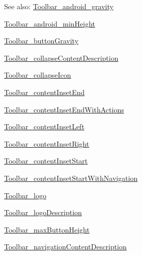 \begin{Desc}
\item[See also:]\hyperlink{classandroid_1_1support_1_1v4_1_1_r_1_1styleable_c8fd7f49fc578cf34e84a402ac885942}{Toolbar\_\-android\_\-gravity} 

\hyperlink{classandroid_1_1support_1_1v4_1_1_r_1_1styleable_66c75941c3656f61bf62178c80516261}{Toolbar\_\-android\_\-minHeight} 

\hyperlink{classandroid_1_1support_1_1v4_1_1_r_1_1styleable_5280809e355d936bf33f4570e3e220a3}{Toolbar\_\-buttonGravity} 

\hyperlink{classandroid_1_1support_1_1v4_1_1_r_1_1styleable_052a3e0cd00166bf0033ee070e9469d0}{Toolbar\_\-collapseContentDescription} 

\hyperlink{classandroid_1_1support_1_1v4_1_1_r_1_1styleable_67413495dc779683b34ca10d393484e9}{Toolbar\_\-collapseIcon} 

\hyperlink{classandroid_1_1support_1_1v4_1_1_r_1_1styleable_a11d101535df2818c53046e1bbf21eb3}{Toolbar\_\-contentInsetEnd} 

\hyperlink{classandroid_1_1support_1_1v4_1_1_r_1_1styleable_40116b816489b853ec057c9c36ebe7c1}{Toolbar\_\-contentInsetEndWithActions} 

\hyperlink{classandroid_1_1support_1_1v4_1_1_r_1_1styleable_58d0345a39808d32a1f60119991bb07e}{Toolbar\_\-contentInsetLeft} 

\hyperlink{classandroid_1_1support_1_1v4_1_1_r_1_1styleable_ec6d939ba7f23b71e3f71aaffe7cde62}{Toolbar\_\-contentInsetRight} 

\hyperlink{classandroid_1_1support_1_1v4_1_1_r_1_1styleable_829314820a2efd83c9b3b622103a1c68}{Toolbar\_\-contentInsetStart} 

\hyperlink{classandroid_1_1support_1_1v4_1_1_r_1_1styleable_f5a322ce2aca1623eb518f2758625f9c}{Toolbar\_\-contentInsetStartWithNavigation} 

\hyperlink{classandroid_1_1support_1_1v4_1_1_r_1_1styleable_f2d9f9e988308a57d3c026af6b7fbbed}{Toolbar\_\-logo} 

\hyperlink{classandroid_1_1support_1_1v4_1_1_r_1_1styleable_511de55d75e2413a6ebdeee92758f44f}{Toolbar\_\-logoDescription} 

\hyperlink{classandroid_1_1support_1_1v4_1_1_r_1_1styleable_ab5a559be253c4d3f91654f99866d524}{Toolbar\_\-maxButtonHeight} 

\hyperlink{classandroid_1_1support_1_1v4_1_1_r_1_1styleable_18960c8315e8816542d771ce838c8551}{Toolbar\_\-navigationContentDescription} 


\end{Desc}
